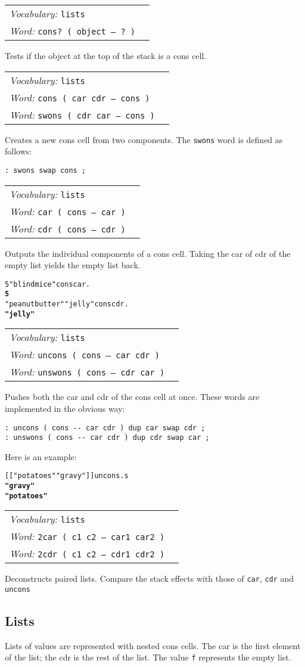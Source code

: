 \documentclass{book}
\newcommand{\vocabulary}[1]{\emph{Vocabulary:} \texttt{#1}&\\}
\newcommand{\ordinaryword}[2]{\index{\texttt{#1}}\emph{Word:} \texttt{#2}&\\}
\newcommand{\wordtable}[1]{


\begin{tabularx}{12cm}{lX}
\hline
#1
\hline
\end{tabularx}

}
\begin{document}
\wordtable{
\vocabulary{lists}
\ordinaryword{cons?}{cons?~( object -- ?~)}
}
Tests if the object at the top of the stack is a cons cell.
\wordtable{
\vocabulary{lists}
\ordinaryword{cons}{cons ( car cdr -- cons )}
\ordinaryword{swons}{swons ( cdr car -- cons )}
}
Creates a new cons cell from two components. The \texttt{swons} word is defined as follows:
\begin{verbatim}
: swons swap cons ;
\end{verbatim}
\wordtable{
\vocabulary{lists}
\ordinaryword{car}{car ( cons -- car )}
\ordinaryword{cdr}{cdr ( cons -- cdr )}
}
Outputs the individual components of a cons cell. Taking the car of cdr of the empty list yields the empty list back.
\begin{alltt}
  5 "blind mice" cons car .
\textbf{5}
  "peanut butter" "jelly" cons cdr .
\textbf{"jelly"}
\end{alltt}
\wordtable{
\vocabulary{lists}
\ordinaryword{uncons}{uncons ( cons -- car cdr )}
\ordinaryword{unswons}{unswons ( cons -- cdr car )}
}
Pushes both the car and cdr of the cons cell at once. These words are implemented in the obvious way:
\begin{verbatim}
: uncons ( cons -- car cdr ) dup car swap cdr ;
: unswons ( cons -- car cdr ) dup cdr swap car ;
\end{verbatim}
Here is an example:
\begin{alltt}
  {[[} "potatoes" "gravy" {]]} uncons .s
\textbf{"gravy"
"potatoes"}
\end{alltt}

\wordtable{
\vocabulary{lists}
\ordinaryword{2car}{2car ( c1 c2 -- car1 car2 )}
\ordinaryword{2cdr}{2cdr ( c1 c2 -- cdr1 cdr2 )}
}
Deconstructs paired lists. Compare the stack effects with those of \verb|car|, \verb|cdr| and \verb|uncons|

\subsection{Lists}\label{lists}

\listglos
{}

Lists of values are represented with nested cons cells. The car is the first element of the list; the cdr is the rest of the list. The value \texttt{f} represents the empty list.
\end{document}
